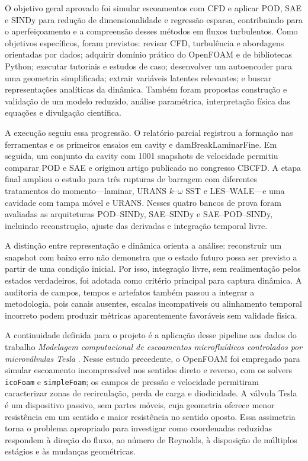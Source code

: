 \documentclass[12pt,a4paper]{article}
\begin{document}
O objetivo geral aprovado foi simular escoamentos com CFD e aplicar POD, SAE e SINDy para redução de dimensionalidade e regressão esparsa, contribuindo para o aperfeiçoamento e a compreensão desses métodos em fluxos turbulentos. Como objetivos específicos, foram previstos: revisar CFD, turbulência e abordagens orientadas por dados; adquirir domínio prático do OpenFOAM e de bibliotecas Python; executar tutoriais e estudos de caso; desenvolver um autoencoder para uma geometria simplificada; extrair variáveis latentes relevantes; e buscar representações analíticas da dinâmica. Também foram propostas construção e validação de um modelo reduzido, análise paramétrica, interpretação física das equações e divulgação científica.

A execução seguiu essa progressão. O relatório parcial registrou a formação nas ferramentas e os primeiros ensaios em cavity e damBreakLaminarFine. Em seguida, um conjunto da cavity com 1001 snapshots de velocidade permitiu comparar POD e SAE e originou artigo publicado no congresso CBCFD. A etapa final ampliou o estudo para três rupturas de barragem com diferentes tratamentos do momento---laminar, URANS $k$--$\omega$ SST e LES--WALE---e uma cavidade com tampa móvel e URANS. Nesses quatro bancos de prova foram avaliadas as arquiteturas POD--SINDy, SAE--SINDy e SAE--POD--SINDy, incluindo reconstrução, ajuste das derivadas e integração temporal livre.

A distinção entre representação e dinâmica orienta a análise: reconstruir um snapshot com baixo erro não demonstra que o estado futuro possa ser previsto a partir de uma condição inicial. Por isso, integração livre, sem realimentação pelos estados verdadeiros, foi adotada como critério principal para captura dinâmica. A auditoria de campos, tempos e artefatos também passou a integrar a metodologia, pois canais ausentes, escalas incompatíveis ou alinhamento temporal incorreto podem produzir métricas aparentemente favoráveis sem validade física.

A continuidade definida para o projeto é a aplicação desse pipeline aos dados do trabalho \textit{Modelagem computacional de escoamentos microfluídicos controlados por microválvulas Tesla} \cite{vieira2025}. Nesse estudo precedente, o OpenFOAM foi empregado para simular escoamento incompressível nos sentidos direto e reverso, com os solvers \texttt{icoFoam} e \texttt{simpleFoam}; os campos de pressão e velocidade permitiram caracterizar zonas de recirculação, perda de carga e diodicidade. A válvula Tesla é um dispositivo passivo, sem partes móveis, cuja geometria oferece menor resistência em um sentido e maior resistência no sentido oposto. Essa assimetria torna o problema apropriado para investigar como coordenadas reduzidas respondem à direção do fluxo, ao número de Reynolds, à disposição de múltiplos estágios e às mudanças geométricas.
\end{document}
